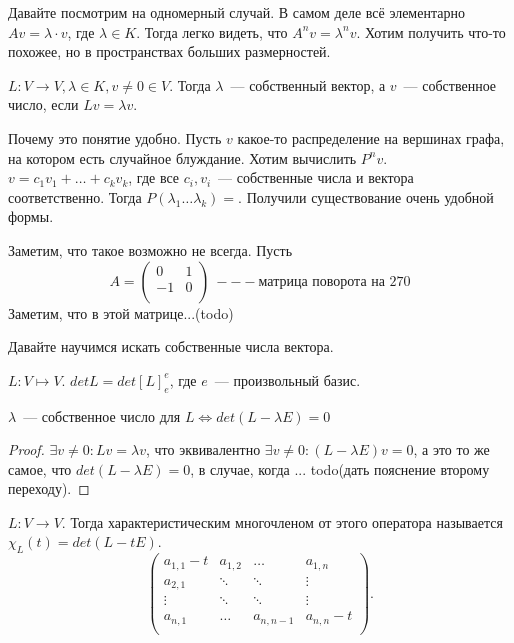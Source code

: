 \begin{motivation}
    Давайте посмотрим на одномерный случай. В самом деле всё элементарно $Av = \lambda\cdot v$, где $\lambda\in K$.
    Тогда легко видеть, что $A^nv = \lambda^n v$. Хотим получить что-то похожее, но в пространствах больших размерностей.
\end{motivation}
\begin{definition}
    $L\colon V\rightarrow V, \lambda\in K, v\not= 0\in V$. Тогда $\lambda$~--- собственный вектор, а $v$~--- собственное число,
    если $Lv = \lambda v$.
\end{definition}
\begin{motivation}
    Почему это понятие удобно. Пусть $v$ какое-то распределение на вершинах графа, на котором есть случайное блуждание.
    Хотим вычислить $P^n v$. $v = c_1v_1 + \dots + c_kv_k$, где все $c_i,v_i$~--- собственные числа и вектора соответственно.
    Тогда $P(\lambda_1\dots \lambda_k) = $.
    Получили существование очень удобной формы.
\end{motivation}
\begin{remark}
    Заметим, что такое возможно не всегда.
    Пусть 
     \[
    A = 
    \begin{pmatrix}
        0& 1\\
        -1&0\\
    \end{pmatrix}
    ~---\text{матрица поворота на 270}\]
    Заметим, что в этой матрице...(todo)
\end{remark}
\begin{motivation}
    Давайте научимся искать собственные числа вектора.
\end{motivation}
\begin{definition}
    $L\colon V\mapsto V$. $det L = det[L]^e_e$, где $e$~--- произвольный базис.
\end{definition}
\begin{statement}
    $\lambda$~--- собственное число для $L \Leftrightarrow det(L - \lambda E) = 0$
\end{statement}
\begin{proof}
    $\exists v\not= 0\colon Lv = \lambda v$, что эквивалентно $\exists v\not=0\colon (L - \lambda E)v = 0$, а это то же
    самое, что $det(L - \lambda E) = 0$, в случае, когда ... todo(дать пояснение второму переходу).
\end{proof}
\begin{definition}
    $L\colon V\rightarrow V$. Тогда характеристическим многочленом от этого оператора 
    называется $\chi_L(t) = det(L - tE)$.
    \[
        \begin{pmatrix}
            a_{1,1}-t&a_{1,2}&\dots&a_{1,n}\\
            a_{2,1} & \ddots & \ddots& \vdots\\
            \vdots & \ddots & \ddots& \vdots\\
            a_{n,1} & \dots & a_{n,n-1}& a_{n,n}-t\\
        \end{pmatrix}
    .\] 
\end{definition}
